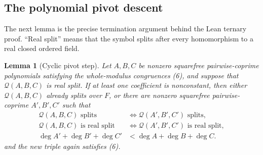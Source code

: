 \documentclass[uplatex,dvipdfmx]{jsarticle}
\newtheorem{lemma}[theorem]{Lemma}
\theoremstyle{definition}
\theoremstyle{remark}
\begin{document}
\subsection{The polynomial pivot descent}

The next lemma is the precise termination argument behind the Lean ternary
proof.  ``Real split'' means that the symbol splits after every homomorphism
to a real closed ordered field.

\begin{lemma}[Cyclic pivot step]\label{lem:pivot}
Let $A,B,C$ be nonzero squarefree pairwise-coprime polynomials satisfying the
whole-modulus congruences (6), and suppose that $\mathcal Q(A,B,C)$ is real
split.  If at least one coefficient is nonconstant, then either
$\mathcal Q(A,B,C)$ already splits over $F$, or there are nonzero squarefree
pairwise-coprime $A',B',C'$ such that
\[
\begin{split}
 \mathcal Q(A,B,C)\text{ splits}
   &\Longleftrightarrow \mathcal Q(A',B',C')\text{ splits},\\
 \mathcal Q(A,B,C)\text{ is real split}
   &\Longleftrightarrow \mathcal Q(A',B',C')\text{ is real split},\\
 \deg A'+\deg B'+\deg C'
   &<\deg A+\deg B+\deg C.
\end{split}                                             \tag{7}
\]
and the new triple again satisfies (6).
\end{lemma}
\end{document}
